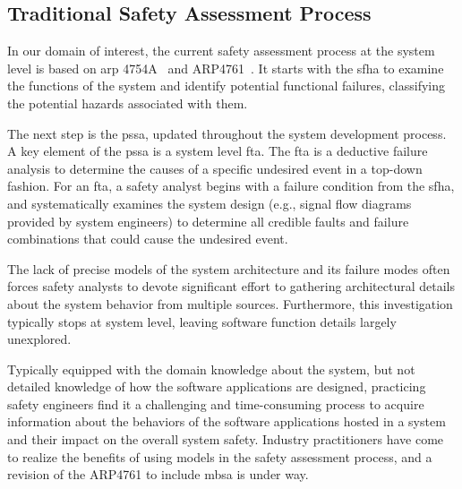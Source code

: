 \subsection{Traditional Safety Assessment Process}
\label{subsec:process}

In our domain of interest, the current safety assessment process at the system level is based on \gls{arp} 4754A~\cite{SAE:ARP4754A} and ARP4761~\cite{SAE:ARP4761}. It starts with the \gls{sfha} to examine the functions of the system and identify potential functional failures, classifying the potential hazards associated with them. 

The next step is the \gls{pssa}, updated throughout the system development process. A key element of the \gls{pssa} is a system level \gls{fta}. The \gls{fta} is a deductive failure analysis to determine the causes of a specific undesired event in a top-down fashion. For an \gls{fta}, a safety analyst begins with a failure condition from the \gls{sfha}, and systematically examines the system design (e.g., signal flow diagrams provided by system engineers) to determine all credible faults and failure combinations that could cause the undesired event. 

The lack of precise models of the system architecture and its failure modes often forces safety analysts to devote significant effort to gathering architectural details about the system behavior from multiple sources. Furthermore, this investigation typically stops at system level, leaving software function details largely unexplored.

Typically equipped with the domain knowledge about the system, but not detailed knowledge of how the software applications are designed, practicing safety engineers find it a challenging and time-consuming process to acquire information about the behaviors of the software applications hosted in a system and their impact on the overall system safety.
Industry practitioners have come to realize the benefits of using models in the safety assessment process, and a revision of the ARP4761 to include \gls{mbsa} is under way. 


